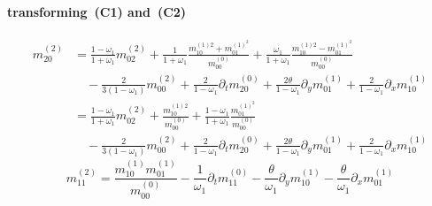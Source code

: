 \documentclass{article}
\begin{document}
  \paragraph{transforming~(C1) and~(C2)}
  \begin{equation}
    \tag{C3}
    \begin{aligned}
      m_{20}^{(2)} &= \frac{1-\omega_1}{1+\omega_1}m_{02}^{(2)}
      + \frac{1}{1+\omega_1}\frac{ m_{10}^{(1)2} + m_{01}^{{(1)}^2}}{m_{00}^{(0)}}
      + \frac{\omega_1}{1+\omega_1} \frac{ m_{10}^{(1)2} - m_{01}^{{(1)}^2}}{m_{00}^{(0)}}
      \\&\quad
      - \frac{ 2}{3(1-\omega_1)}m_{00}^{(2)}
      + \frac{2}{1-\omega_1}\partial_t m_{20}^{(0)} + \frac{2\theta}{1-\omega_1}\partial_y m_{01}^{(1)} + \frac{2}{1-\omega_1}\partial_x m_{10}^{(1)} \\
      &= \frac{1-\omega_1}{1+\omega_1}m_{02}^{(2)}
     + \frac{ m_{10}^{(1)2} }{m_{00}^{(0)}}
     + \frac{1-\omega_1}{1+\omega_1}\frac{m_{01}^{{(1)}^2}}{m_{00}^{(0)}}
     \\&\quad
     - \frac{ 2}{3(1-\omega_1)}m_{00}^{(2)}
     + \frac{2}{1-\omega_1}\partial_t m_{20}^{(0)} + \frac{2\theta}{1-\omega_1}\partial_y m_{01}^{(1)} + \frac{2}{1-\omega_1}\partial_x m_{10}^{(1)}
    \end{aligned}
  \end{equation}
  \begin{equation}
    \tag{C4}
    m_{11}^{(2)} =  \frac{ m_{10}^{(1)}m_{01}^{(1)}}{m_{00}^{(0)}} - \frac{1}{\omega_1} \partial_t m_{11}^{(0)} - \frac{\theta}{\omega_1}\partial_y m_{10}^{(1)} - \frac{\theta}{\omega_1}\partial_x m_{01}^{(1)}
  \end{equation}
\end{document}
